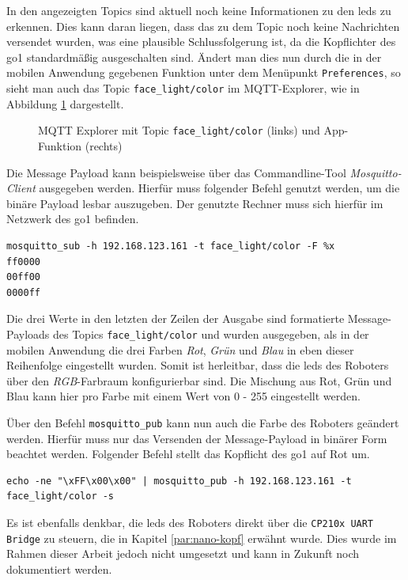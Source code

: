In den angezeigten Topics sind aktuell noch keine Informationen zu den \glspl{led} zu erkennen.
Dies kann daran liegen, dass das zu dem Topic noch keine Nachrichten versendet wurden, was eine plausible Schlussfolgerung
ist, da die Kopflichter des \gls{go1} standardmäßig ausgeschalten sind.
Ändert man dies nun durch die in der mobilen Anwendung gegebenen Funktion unter dem Menüpunkt \texttt{Preferences}, so
sieht man auch das Topic \texttt{face\_light/color} im MQTT-Explorer, wie in Abbildung \ref{fig:app-mqtt-facelight} dargestellt.

\begin{figure}[h]
    \caption{MQTT Explorer mit Topic \texttt{face\_light/color} (links) und App-Funktion (rechts)}\label{fig:app-mqtt-facelight}
\end{figure}

Die Message Payload kann beispielsweise über das Commandline-Tool \emph{Mosquitto-Client} ausgegeben werden.
Hierfür muss folgender Befehl genutzt werden, um die binäre Payload lesbar auszugeben.
Der genutzte Rechner muss sich hierfür im Netzwerk des \gls{go1} befinden.

\begin{lstlisting}
mosquitto_sub -h 192.168.123.161 -t face_light/color -F %x
ff0000
00ff00
0000ff
\end{lstlisting}

\noindent Die drei Werte in den letzten der Zeilen der Ausgabe sind formatierte Message-Payloads des Topics \texttt{face\_light/color}
und wurden ausgegeben, als in der mobilen Anwendung die drei Farben \emph{Rot}, \emph{Grün} und \emph{Blau} in eben dieser
Reihenfolge eingestellt wurden.
Somit ist herleitbar, dass die \glspl{led} des Roboters über den \emph{RGB}-Farbraum konfigurierbar sind.
Die Mischung aus Rot, Grün und Blau kann hier pro Farbe mit einem Wert von \num{0} - \num{255} eingestellt werden.

Über den Befehl \texttt{mosquitto\_pub} kann nun auch die Farbe des Roboters geändert werden.
Hierfür muss nur das Versenden der Message-Payload in binärer Form beachtet werden.
Folgender Befehl stellt das Kopflicht des \gls{go1} auf Rot um.

\begin{lstlisting}
echo -ne "\xFF\x00\x00" | mosquitto_pub -h 192.168.123.161 -t face_light/color -s
\end{lstlisting}

\noindent Es ist ebenfalls denkbar, die \glspl{led} des Roboters direkt über die \texttt{CP210x UART Bridge} zu steuern, die in Kapitel
\ref{par:nano-kopf} erwähnt wurde.
Dies wurde im Rahmen dieser Arbeit jedoch nicht umgesetzt und kann in Zukunft noch dokumentiert werden.

